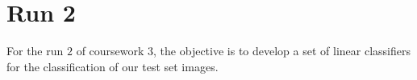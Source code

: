 \section{Run 2}

For the run $2$ of coursework $3$, the objective is to develop a set of linear classifiers for the classification of our test set images. 